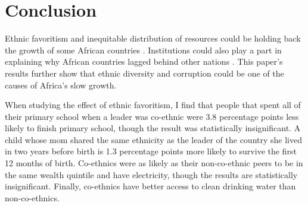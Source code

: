 \documentclass{wptemp}
\begin{document}
%
%
%

\section{Conclusion}\label{sec6}
Ethnic favoritism and inequitable distribution of resources could be holding back the growth of some African countries \citep{easterly1997africa, alesina2005ethnic}. Institutions could also play a part in explaining why African countries lagged behind other nations \citep{acemoglu2001colonial, alsan2015effect}. This paper's results further show that ethnic diversity and corruption could be one of the causes of Africa's slow growth. 

When studying the effect of ethnic favoritism, I find that people that spent all of their primary school when a leader was co-ethnic were 3.8 percentage points less likely to finish primary school, though the result was statistically insignificant. A child whose mom shared the same ethnicity as the leader of the country she lived in two years before birth is 1.3 percentage points more likely to survive the first 12 months of birth. Co-ethnics were as likely as their non-co-ethnic peers to be in the same wealth quintile and have electricity, though the results are statistically insignificant. Finally, co-ethnics have better access to clean drinking water than non-co-ethnics.
\end{document}
